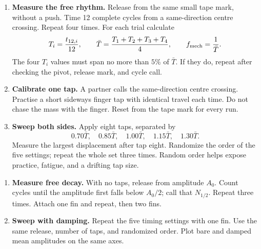 \begin{enumerate}
\item \textbf{Measure the free rhythm.} Release from the same small tape mark,
without a push. Time 12 complete cycles from a same-direction centre crossing.
Repeat four times. For each trial calculate
\[
T_i=\frac{t_{12,i}}{12},\qquad
\bar T=\frac{T_1+T_2+T_3+T_4}{4},\qquad f_{\rm mech}=\frac{1}{\bar T}.
\]
The four \(T_i\) values must span no more than \(5\%\) of \(\bar T\). If they do,
repeat after checking the pivot, release mark, and cycle call.

\item \textbf{Calibrate one tap.} A partner calls the same-direction centre
crossing. Practise a short sideways finger tap with identical travel each time.
Do not chase the mass with the finger. Reset from the tape mark for every run.

\item \textbf{Sweep both sides.} Apply eight taps, separated by
\[
0.70\bar T,\quad0.85\bar T,\quad1.00\bar T,\quad1.15\bar T,\quad1.30\bar T.
\]
Measure the largest displacement after tap eight. Randomize the order of the
five settings; repeat the whole set three times. Random order helps expose
practice, fatigue, and a drifting tap size.
\end{enumerate}


\begin{enumerate}[resume]
\item \textbf{Measure free decay.} With no taps, release from amplitude \(A_0\).
Count cycles until the amplitude first falls below \(A_0/2\); call that
\(N_{1/2}\). Repeat three times. Attach one fin and repeat, then two fins.
\item \textbf{Sweep with damping.} Repeat the five timing settings with one
fin. Use the same release, number of taps, and randomized order. Plot bare and
damped mean amplitudes on the same axes.
\end{enumerate}

